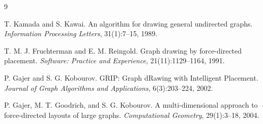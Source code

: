 \documentclass[11pt]{article}
\begin{document}
\begin{thebibliography}{9}

T. Kamada and S. Kawai.
\newblock An algorithm for drawing general undirected graphs.
\newblock \emph{Information Processing Letters}, 31(1):7--15, 1989.

T. M. J. Fruchterman and E. M. Reingold.
\newblock Graph drawing by force-directed placement.
\newblock \emph{Software: Practice and Experience}, 21(11):1129--1164, 1991.

P. Gajer and S. G. Kobourov.
\newblock GRIP: Graph dRawing with Intelligent Placement.
\newblock \emph{Journal of Graph Algorithms and Applications}, 6(3):203--224, 2002.

P. Gajer, M. T. Goodrich, and S. G. Kobourov.
\newblock A multi-dimensional approach to force-directed layouts of large graphs.
\newblock \emph{Computational Geometry}, 29(1):3--18, 2004.

\end{thebibliography}
\end{document}
